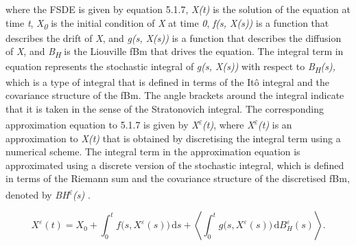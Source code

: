 \documentclass[12pt,a4paper]{report}
\numberwithin{equation}{section}
\begin{document}
where the FSDE is given by equation 5.1.7, \emph{X(t)} is the solution
of the equation at time \emph{t}, \emph{X\textsubscript{0}} is the
initial condition of \emph{X} at time \emph{0}, \emph{f(s, X(s))} is a
function that describes the drift of \emph{X}, and \emph{g(s, X(s))} is
a function that describes the diffusion of \emph{X}, and
\emph{B\textsubscript{H}} is the Liouville fBm that drives the equation.
The integral term in equation represents the stochastic integral of
\emph{g(s, X(s))} with respect to \emph{B\textsubscript{H}(s),} which is
a type of integral that is defined in terms of the Itô integral and the
covariance structure of the fBm. The angle brackets around the integral
indicate that it is taken in the sense of the Stratonovich integral. The
corresponding approximation equation to 5.1.7 is given by
\emph{X\textsuperscript{$\varepsilon$}(t)}, where \emph{X\textsuperscript{$\varepsilon$}(t)} is
an approximation to \emph{X(t)} that is obtained by discretising the
integral term using a numerical scheme. The integral term in the
approximation equation is approximated using a discrete version of the
stochastic integral, which is defined in terms of the Riemann sum and
the covariance structure of the discretised fBm, denoted by
\emph{BH\textsuperscript{$\varepsilon$}(s)} \cite{jafari2021fuzzy_81}.

\begin{equation}\tag{5.1.8}\label{eq:5.1.8}
X^{\varepsilon}(t)
= X_{0}
+ \int_{0}^{t} f\bigl(s, X^{\varepsilon}(s)\bigr)\,\mathrm{d}s
+ \left\langle \int_{0}^{t} g\bigl(s, X^{\varepsilon}(s)\bigr)\,\mathrm{d}B_{H}^{\varepsilon}(s)\right\rangle .
\end{equation}
\end{document}
